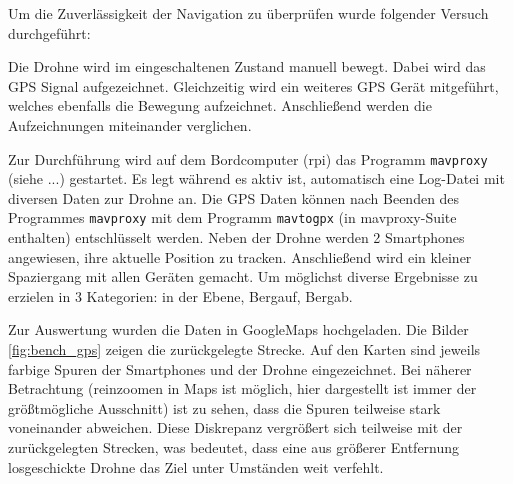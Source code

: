 Um die Zuverlässigkeit der Navigation zu überprüfen wurde folgender Versuch durchgeführt:
\hspace{3cm}\begin{minipage}{\textwidth}
Die Drohne wird im eingeschaltenen Zustand manuell bewegt. Dabei wird das GPS Signal aufgezeichnet. Gleichzeitig wird ein weiteres GPS Gerät mitgeführt, welches ebenfalls die Bewegung aufzeichnet. Anschließend werden die Aufzeichnungen miteinander verglichen.
\end{minipage}

Zur Durchführung wird auf dem Bordcomputer (\gls{rpi}) das Programm \texttt{mavproxy} (siehe ...) gestartet. Es legt während es aktiv ist, automatisch eine Log-Datei mit diversen Daten zur Drohne an. Die GPS Daten können nach Beenden des Programmes \texttt{mavproxy} mit dem Programm \texttt{mavtogpx} (in mavproxy-Suite enthalten) entschlüsselt werden. Neben der Drohne werden 2 Smartphones angewiesen, ihre aktuelle Position zu tracken. Anschließend wird ein kleiner Spaziergang mit allen Geräten gemacht. Um möglichst diverse Ergebnisse zu erzielen in 3 Kategorien: in der Ebene, Bergauf, Bergab.

Zur Auswertung wurden die Daten in GoogleMaps hochgeladen. Die Bilder \ref{fig:bench_gps} zeigen die zurückgelegte Strecke. Auf den Karten sind jeweils farbige Spuren der Smartphones und der Drohne eingezeichnet. Bei näherer Betrachtung (reinzoomen in Maps ist möglich, hier dargestellt ist immer der größtmögliche Ausschnitt) ist zu sehen, dass die Spuren teilweise stark voneinander abweichen. Diese Diskrepanz vergrößert sich teilweise mit der zurückgelegten Strecken, was bedeutet, dass eine aus größerer Entfernung losgeschickte Drohne das Ziel unter Umständen weit verfehlt.

